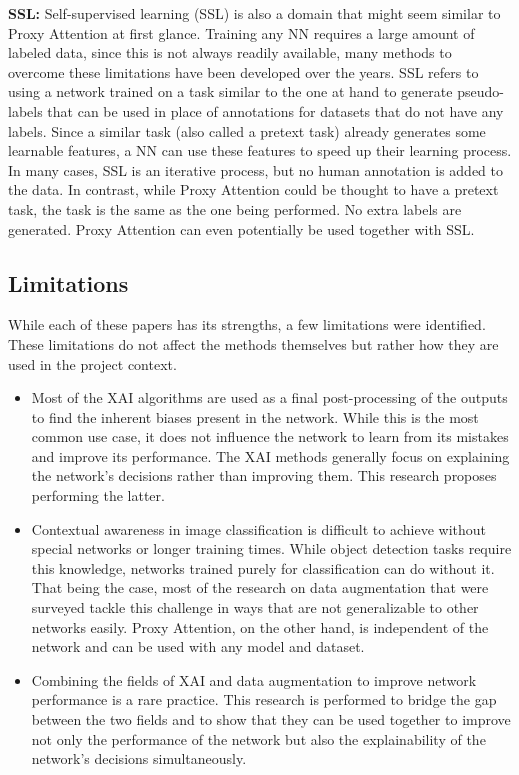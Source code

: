 \documentclass[a4paper,11pt,openright]{book}
\begin{document}
\textbf{SSL: }
Self-supervised learning (SSL) is also a domain that might seem similar to Proxy Attention at first glance. Training any NN requires a large amount of labeled data, since this is not always readily available, many methods to overcome these limitations have been developed over the years. SSL refers to using a network trained on a task similar to the one at hand to generate pseudo-labels that can be used in place of annotations for datasets that do not have any labels. Since a similar task (also called a pretext task) already generates some learnable features, a NN can use these features to speed up their learning process. In many cases, SSL is an iterative process, but no human annotation is added to the data. 
In contrast, while Proxy Attention could be thought to have a pretext task, the task is the same as the one being performed. No extra labels are generated. Proxy Attention can even potentially be used together with SSL.

\subsection{Limitations}
While each of these papers has its strengths, a few limitations were identified. These limitations do not affect the methods themselves but rather how they are used in the project context.
\begin{itemize}
    \item Most of the XAI algorithms are used as a final post-processing of the outputs to find the inherent biases present in the network. While this is the most common use case, it does not influence the network to learn from its mistakes and improve its performance. The XAI methods generally focus on explaining the network's decisions rather than improving them. This research proposes performing the latter.
    \item Contextual awareness in image classification is difficult to achieve without special networks or longer training times. While object detection tasks require this knowledge, networks trained purely for classification can do without it. That being the case, most of the research on data augmentation that were surveyed tackle this challenge in ways that are not generalizable to other networks easily. Proxy Attention, on the other hand, is independent of the network and can be used with any model and dataset. 
    \item Combining the fields of XAI and data augmentation to improve network performance is a rare practice. This research is performed to bridge the gap between the two fields and to show that they can be used together to improve not only the performance of the network but also the explainability of the network's decisions simultaneously.

\end{itemize}
\end{document}
